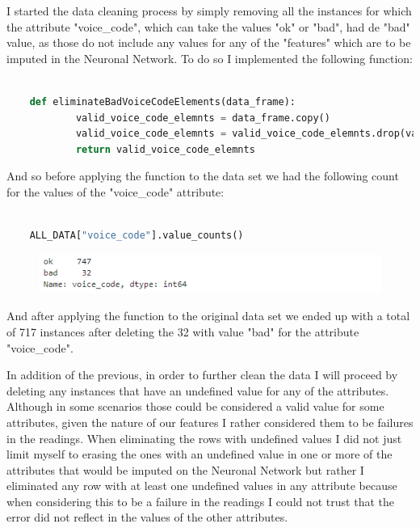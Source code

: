 \documentclass[12pt, a4paper]{article}
\begin{document}
	I started the data cleaning process by simply removing all the instances for which the attribute "voice\_code", which can take the values "ok" or "bad", had de "bad" value, as those do not include any values for any of the "features" which are to be imputed in the Neuronal Network. To do so I implemented the following function:
	
	\vspace{5mm}
	
	\begin{lstlisting}[language=Python]
		
	def eliminateBadVoiceCodeElements(data_frame):
			valid_voice_code_elemnts = data_frame.copy()
			valid_voice_code_elemnts = valid_voice_code_elemnts.drop(valid_voice_code_elemnts[valid_voice_code_elemnts["voice_code"] == "bad" ].index)
			return valid_voice_code_elemnts
	\end{lstlisting}
	
	And so before applying the function to the data set we had the following count for the values of the "voice\_code" attribute:
	
	\vspace{5mm}
	
	\begin{lstlisting}[language=Python]
		
	ALL_DATA["voice_code"].value_counts()
	\end{lstlisting}
	
	\begin{figure}[h]
		\includegraphics{img/VoiceCodeBefore.png}
	\end{figure}

	And after applying the function to the original data set we ended up with a total of 717 instances after deleting the 32 with value "bad" for the attribute "voice\_code".
	
	In addition of the previous, in order to further clean the data I will proceed by deleting any instances that have an undefined value for any of the attributes. Although in some scenarios those could be considered a valid value for some attributes, given the nature of our features I rather considered them to be failures in the readings. When eliminating the rows with undefined values I did not just limit myself to erasing the ones with an undefined value in one or more of the attributes that would be imputed on the Neuronal Network but rather I eliminated any row with at least one undefined values in any attribute because when considering this to be a failure in the readings I could not trust that the error did not reflect in the values of the other attributes.
	
\end{document}
